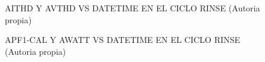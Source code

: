 \begin{figure}[H]
  \hfill
  \hfill
  \hfill
  \caption{AITHD Y AVTHD VS DATETIME EN EL CICLO RINSE (Autoria propia)}
  \end{figure}
\begin{figure}[H]
  \hfill
  \hfill
  \hfill
  \caption{APF1-CAL Y AWATT VS DATETIME EN EL CICLO RINSE (Autoria propia)}
  \end{figure}
